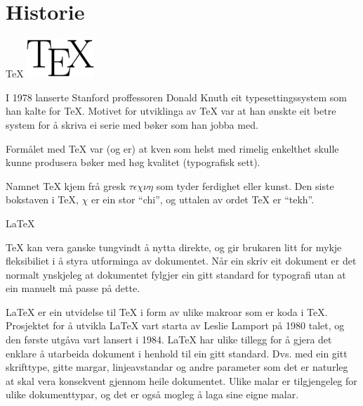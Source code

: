 	\section{Historie}
\label{sec:history}

\begin{frame}{\TeX}
  \includegraphics[width=1in]{img/tex_logo.png}
  
	I 1978 lanserte Stanford proffessoren Donald Knuth eit typesettingssystem som han kalte for \TeX{}. Motivet for utviklinga av \TeX{} var at han ønskte eit betre system for å skriva ei serie med bøker som han jobba med.
	
	Formålet med \TeX{} var (og er) at kven som helst med rimelig enkelthet skulle kunne produsera bøker med høg kvalitet (typografisk sett).
	
	Namnet \TeX{} kjem frå gresk \(\tau\epsilon\chi\nu\eta\) som tyder ferdighet eller kunst. Den siste bokstaven i \TeX{}, $\chi$ er ein stor ``chi'', og uttalen av ordet \TeX{} er ``tekh''.
	
\end{frame}

\begin{frame}{\LaTeX}
	
	
	
	\TeX{} kan vera ganske tungvindt å nytta direkte, og gir brukaren litt for mykje fleksibiliet i å styra utforminga av dokumentet. Når ein skriv eit dokument er det normalt ynskjeleg at dokumentet fylgjer ein gitt standard for typografi utan at ein manuelt må passe på dette.
	
	\LaTeX{} er ein utvidelse til \TeX{} i form av ulike makroar som er koda i \TeX{}. Prosjektet for å utvikla \LaTeX{} vart starta av Leslie Lamport på 1980 talet, og den første utgåva vart lansert i 1984. \LaTeX{} har ulike tillegg for å gjera det enklare å utarbeida dokument i henhold til ein gitt standard. Dvs. med ein gitt skrifttype, gitte margar, linjeavstandar og andre parameter som det er naturleg at skal vera konsekvent gjennom heile dokumentet. Ulike malar er tilgjengeleg for ulike dokumenttypar, og det er også mogleg å laga sine eigne malar.
	
\end{frame}


